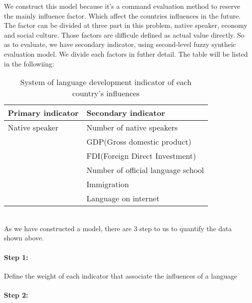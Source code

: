 \documentclass{mcmthesis}
\begin{document}
\qquad We construct this model because it's a command evaluation method to reserve the mainly influence factor. Which affect the countries influences in the future. The factor can be divided at three part in this problem,
native speaker, economy and social culture. Those factors are difficule defined as actual value directly. So as to evaluate, we have secondary indicator, 
using second-level fuzzy syntheic evaluation model. We divide each factors in futher detail. The table will be listed in the followiing:
\begin{table}[h]
\begin{center}
\hspace{-1in}

\fontsize{10}{12}\selectfont
\setlength{\tabcolsep}{10mm} 
\begin{tabular}{l l}
\toprule
\textbf{Primary indicator}     & \textbf{Secondary indicator}    \\
\midrule
\addlinespace

Native speaker & Number of native speakers  \\
\addlinespace
\multirow{2}{*}{Economy}    & GDP(Gross domestic product) \\
 &FDI(Foreign Direct Investment)\\
\addlinespace

\multirow{3}{*}{Social culture} &  Number of official language school \\
 &Immigration \\
 &Language on internet \\

\bottomrule
\end{tabular}

\caption{System of language development indicator of each country's influences}
\end{center}
\end{table}
\\
 \qquad As we have constructed a model, there are 3 step to us to quantify the data shown above.

\paragraph {Step 1:} Define the weight of each indicator that associate the influences of a language

\paragraph {Step 2:} 
\end{document}
